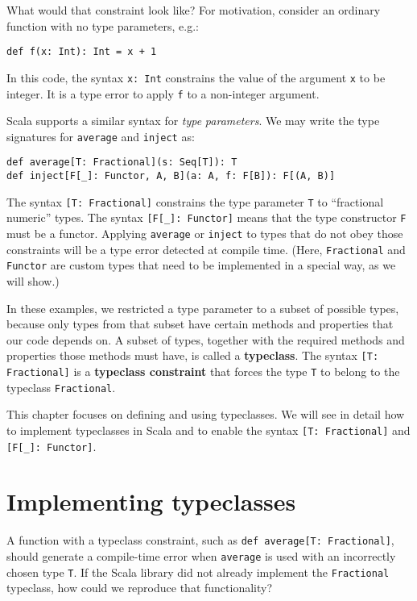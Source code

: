 What would that constraint look like? For motivation, consider an
ordinary function with no type parameters, e.g.:
\begin{lstlisting}
def f(x: Int): Int = x + 1
\end{lstlisting}
In this code, the syntax \lstinline!x: Int! constrains the value
of the argument \lstinline!x! to be integer. It is a type error to
apply \lstinline!f! to a non-integer argument. 

Scala supports a similar syntax for \emph{type} \emph{parameters}.
We may write the type signatures for \lstinline!average! and \lstinline!inject!
as:
\begin{lstlisting}
def average[T: Fractional](s: Seq[T]): T
def inject[F[_]: Functor, A, B](a: A, f: F[B]): F[(A, B)]
\end{lstlisting}
The syntax \lstinline![T: Fractional]! constrains the type parameter
\lstinline!T! to \textsf{``}fractional numeric\textsf{''} types. The syntax \lstinline![F[_]: Functor]!
means that the type constructor \lstinline!F! must be a functor.
Applying \lstinline!average! or \lstinline!inject! to types that
do not obey those constraints will be a type error detected at compile
time. (Here, \lstinline!Fractional! and \lstinline!Functor! are
custom types that need to be implemented in a special way, as we will
show.) 

In these examples, we restricted a type parameter to a subset of possible
types, because only types from that subset have certain methods and
properties that our code depends on. A subset of types, together with
the required methods and properties those methods must have, is called
a \textbf{typeclass}. The syntax \lstinline![T: Fractional]!
is a \textbf{typeclass constraint} that
forces the type \lstinline!T! to belong to the typeclass \lstinline!Fractional!.

This chapter focuses on defining and using typeclasses. We will see
in detail how to implement typeclasses in Scala and to enable the
syntax \lstinline![T: Fractional]! and \lstinline![F[_]: Functor]!. 

\section{Implementing typeclasses}

A function with a typeclass constraint, such as \lstinline!def average[T: Fractional]!,
should generate a compile-time error when \lstinline!average! is
used with an incorrectly chosen type \lstinline!T!. If the Scala
library did not already implement the \lstinline!Fractional! typeclass,
how could we reproduce that functionality?

